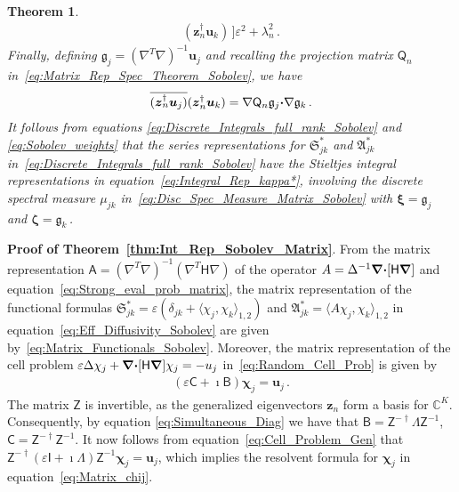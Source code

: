 \documentclass[english,12pt,jmp,graphicx]{revtex4-1}
\newcommand{\vecu}{\boldsymbol{u}}
\newcommand{\vecxi}{\boldsymbol{\xi}}
\newcommand{\veczeta}{\boldsymbol{\zeta}}
\newcommand{\vecz}{\boldsymbol{z}}
\newcommand{\vecg}{\mathfrak{g}}
\newcommand{\thmref}[1]{Theorem~\ref{#1}}
\newcommand{\bnabla}{\mbox{\boldmath${\nabla}$}}
\newcommand{\bcdot}{\mbox{\boldmath${\cdot}$}}
\newcommand{\Sg}{\mathfrak{S}}
\newcommand{\Ag}{\mathfrak{A}}
\newtheorem{theorem}{Theorem}
\newcommand{\vecchi}{\boldsymbol{\chi}}
\newcommand{\Hm}{\mathsf{H}}
\newcommand{\Am}{\mathsf{A}}
\newcommand{\Bm}{\mathsf{B}}
\newcommand{\Cm}{\mathsf{C}}
\newcommand{\Zm}{\mathsf{Z}}
\newcommand{\Qm}{\mathsf{Q}}
\newcommand{\Ib}{\mathsf{I}}
\begin{document}
\begin{theorem}
\begin{align}
{                                         (\vecz_n^\dagger\vecu_k)\,]}
           {\varepsilon^2+\lambda_n^2}\,.
\end{align}
%
Finally, defining $\vecg_j=(\nabla^T\nabla)^{-1}\vecu_j$ and recalling
the projection matrix $\Qm_n$ 
in~\eqref{eq:Matrix_Rep_Spec_Theorem_Sobolev}, we have 
%
%
\begin{align}\label{eq:Sobolev_weights}
  \overline{(\vecz_n^\dagger\vecu_j)}(\vecz_n^\dagger\vecu_k)
  =\nabla\Qm_n\vecg_j\bcdot\nabla\vecg_k\,.
\end{align}
%
It follows from equations
\eqref{eq:Discrete_Integrals_full_rank_Sobolev} and \eqref{eq:Sobolev_weights}
that the series representations for $\Sg^*_{jk}$ and $\Ag^*_{jk}$
in~\eqref{eq:Discrete_Integrals_full_rank_Sobolev} have the Stieltjes   
integral representations in equation~\eqref{eq:Integral_Rep_kappa*},
involving the discrete spectral measure $\mu_{jk}$ 
in~\eqref{eq:Disc_Spec_Measure_Matrix_Sobolev} with 
$\vecxi=\vecg_j$ and $\veczeta=\vecg_k\,$.
%
\end{theorem}
%


\noindent
\textbf{Proof of \thmref{thm:Int_Rep_Sobolev_Matrix}}.
From the matrix
representation $\Am=(\nabla^T\nabla)^{-1}(\nabla^T\Hm\nabla)$ of the
operator $A=\Delta^{-1}\bnabla\bcdot[\Hm\bnabla]$ 
and equation~\eqref{eq:Strong_eval_prob_matrix}, the matrix representation     
of the functional formulas $\Sg^*_{jk}=\varepsilon(\delta_{jk}+\langle\chi_j,\chi_k\rangle_{1,2})$ and
$\Ag^*_{jk}=\langle A\chi_j,\chi_k\rangle_{1,2}$ in
equation~\eqref{eq:Eff_Diffusivity_Sobolev} are given
by~\eqref{eq:Matrix_Functionals_Sobolev}.  
Moreover,  the matrix representation of the cell problem
$\varepsilon\Delta\chi_j+\bnabla\bcdot[\Hm\bnabla]\chi_j=-u_j$ 
in~\eqref{eq:Random_Cell_Prob} is given by   
% 
\begin{align}\label{eq:Cell_Problem_Gen}
  (\varepsilon\Cm+\imath\Bm)\vecchi_j=\vecu_j\,.
\end{align}
%
The matrix $\Zm$ is invertible, as the generalized eigenvectors
$\vecz_n$ form a basis for $\mathbb{C}^K$. Consequently, by equation
\eqref{eq:Simultaneous_Diag} we have that
$\Bm=\Zm^{-\dagger}\Lambda\Zm^{-1}$, $\Cm=\Zm^{-\dagger}\Zm^{-1}$. It now follows from
equation~\eqref{eq:Cell_Problem_Gen} that
$\Zm^{-\dagger}(\varepsilon\Ib+\imath\Lambda)\Zm^{-1}\vecchi_j=\vecu_j$,
which implies the resolvent formula for $\vecchi_j$ in
equation~\eqref{eq:Matrix_chij}. 
\end{document}
